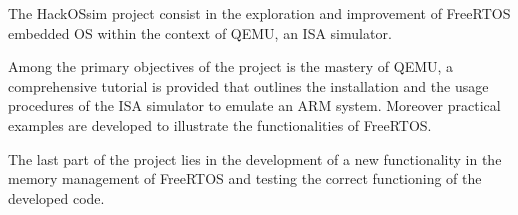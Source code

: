 The HackOSsim project consist in the exploration and improvement of FreeRTOS embedded OS within the context of QEMU, an ISA simulator.

Among the primary objectives of the project is the mastery of QEMU, a comprehensive tutorial is provided that outlines the installation and the usage procedures of the ISA simulator to emulate an ARM system. Moreover practical examples are developed to illustrate the functionalities of FreeRTOS.

The last part of the project lies in the development of a new functionality in the memory management of FreeRTOS and testing the correct functioning of the developed code.